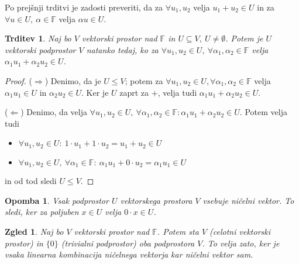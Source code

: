 \documentclass[10pt, a4paper]{article}
\newtheorem{trditev}[izr]{Trditev}
\newtheorem*{opomba}{Opomba}
\newtheorem{zgled}{Zgled}[section]
\newenvironment{noticeC}{%
  \tcolorbox[%
  notitle,
  empty,
  enhanced,  %
  breakable,
  coltext=black, 
  fontupper=\rmfamily,
  parbox=false,
  noparskip,
  sharp corners,
  boxrule=-1pt,  %
  frame hidden,
  left=7pt,  %
  right=7pt,
  top=5pt,
  bottom=5pt,
  before skip=2.5ex plus 2pt,
  after skip=2.5ex plus 2pt,
  overlay unbroken and last={%
  },
  ]}
{\endtcolorbox}
\newenvironment{dokaz}%
  {\begin{noticeC}\begin{proof}}%
  {\end{proof}\end{noticeC}}
\newcommand{\F}{\mathbb {F}}
\begin{document}
Po prejšnji trditvi je zadosti preveriti, da za $\forall u_1, u_2$ velja $u_1 + u_2 \in U$ in za $\forall u \in U,\ \alpha \in \F$ velja $\alpha u \in U$.

\begin{trditev}
    Naj bo $V$ vektorski prostor nad $\F$ in $U \subseteq V,\ U \neq \emptyset$. 
    Potem je $U$ vektorski podprostor $V$ natanko tedaj, ko za $\forall u_1, u_2 \in U,\ \forall \alpha_1, \alpha_2 \in \F$ velja 
    $\alpha_1 u_1 + \alpha_2 u_2 \in U$.
\end{trditev}

\begin{dokaz}
    ($\Rightarrow$) Denimo, da je $U \leq V$; potem za $\forall u_1, u_2 \in U, \forall \alpha_1, \alpha_2 \in \F$ velja $\alpha_1 u_1 \in U$ in $\alpha_2 u_2 \in U.$
    Ker je $U$ zaprt za $+$, velja tudi
    $\alpha_1 u_1 + \alpha_2 u_2 \in U.$

    ($\Leftarrow$) Denimo, da velja $\forall u_1, u_2 \in U,\ \forall \alpha_1, \alpha_2 \in \F: \alpha_1 u_1 + \alpha_2 u_2 \in U.$ Potem velja tudi
    \begin{itemize}
        \item $\forall u_1, u_2 \in U:\ 1 \cdot u_1 + 1 \cdot u_2 = u_1 + u_2 \in U$
        \item $\forall u_1, u_2 \in U,\ \forall \alpha_1 \in \F:\ \alpha_1 u_1 + 0 \cdot u_2 = \alpha_1 u_1 \in U$
    \end{itemize}
    in od tod sledi $U \leq V$.
\end{dokaz}

\begin{opomba}
    Vsak podprostor $U$ vektorskega prostora $V$ vsebuje ničelni vektor. 
    To sledi, ker za poljuben $x \in U$ velja $0 \cdot x \in U$.
\end{opomba}

\begin{zgled}
    Naj bo $V$ vektorski prostor nad $\F$. Potem sta $V$ (celotni vektorski prostor) in $\{0\}$ (trivialni podprostor) oba podprostora $V$.
    To velja zato, ker je vsaka linearna kombinacija ničelnega vektorja kar ničelni vektor sam.
\end{zgled}
\end{document}
